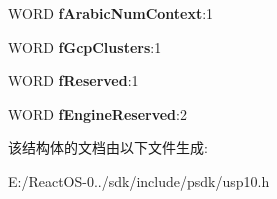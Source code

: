 \begin{DoxyCompactItemize}
W\+O\+RD {\bfseries f\+Arabic\+Num\+Context}\+:1
\item 
\mbox{\label{structtag___s_c_r_i_p_t___s_t_a_t_e_a79c7c1ad2b3bf67e7a73533d672309b0}} 
W\+O\+RD {\bfseries f\+Gcp\+Clusters}\+:1
\item 
\mbox{\label{structtag___s_c_r_i_p_t___s_t_a_t_e_ae258ce15fa8231e5b9ff3376e03a91ae}} 
W\+O\+RD {\bfseries f\+Reserved}\+:1
\item 
\mbox{\label{structtag___s_c_r_i_p_t___s_t_a_t_e_afaebc3af752a416e97776610229b20de}} 
W\+O\+RD {\bfseries f\+Engine\+Reserved}\+:2
\end{DoxyCompactItemize}


该结构体的文档由以下文件生成\+:\begin{DoxyCompactItemize}
\item 
E\+:/\+React\+O\+S-\/0../sdk/include/psdk/usp10.\+h\end{DoxyCompactItemize}
